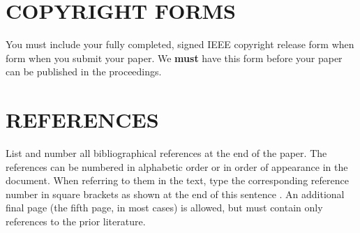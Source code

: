 \documentclass[spanish]{article}
\begin{document}
%
%
%



\section{COPYRIGHT FORMS}
\label{sec:copyright}

You must include your fully completed, signed IEEE copyright release form when
form when you submit your paper. We {\bf must} have this form before your paper
can be published in the proceedings.

\section{REFERENCES}
\label{sec:ref}

List and number all bibliographical references at the end of the
paper. The references can be numbered in alphabetic order or in
order of appearance in the document. When referring to them in
the text, type the corresponding reference number in square
brackets as shown at the end of this sentence \cite{C2}. An
additional final page (the fifth page, in most cases) is
allowed, but must contain only references to the prior
literature.



\end{document}
